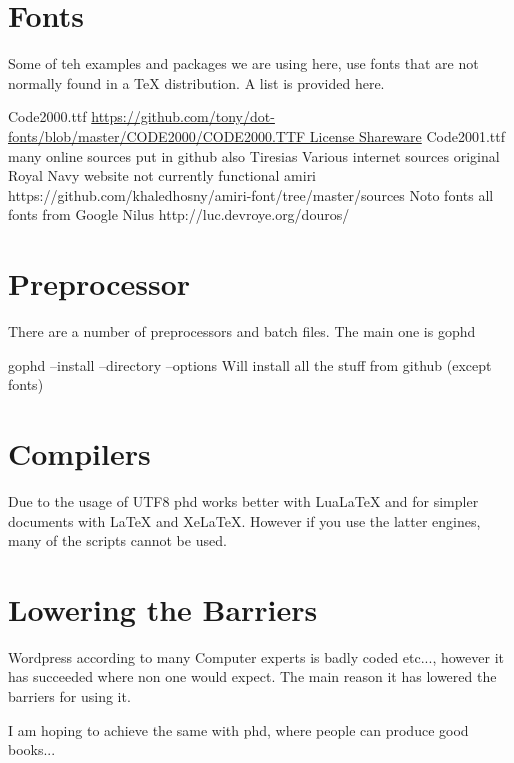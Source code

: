 \section{Fonts}

Some of teh examples and packages we are using here, use fonts that are not normally found in a TeX distribution. A list is provided here.

Code2000.ttf   \url{https://github.com/tony/dot-fonts/blob/master/CODE2000/CODE2000.TTF License Shareware}
Code2001.ttf  many online sources put in github also
Tiresias       Various internet sources original Royal Navy website not currently functional
amiri          https://github.com/khaledhosny/amiri-font/tree/master/sources
Noto fonts     all fonts from Google
Nilus  http://luc.devroye.org/douros/


\section{Preprocessor}

There are a number of preprocessors and batch files. The main one is gophd

gophd --install  --directory --options  Will install all the stuff from github (except fonts)

\section{Compilers}

Due to the usage of UTF8 phd works better with LuaLaTeX  and for simpler documents with LaTeX and XeLaTeX. However
if you use the latter engines, many of the scripts cannot be used.

\section{Lowering the Barriers}

Wordpress according to many Computer experts is badly coded etc..., however it has succeeded where non one would expect. The main reason it has
lowered the barriers for using it.

I am hoping to achieve the same with phd, where people can produce good books...